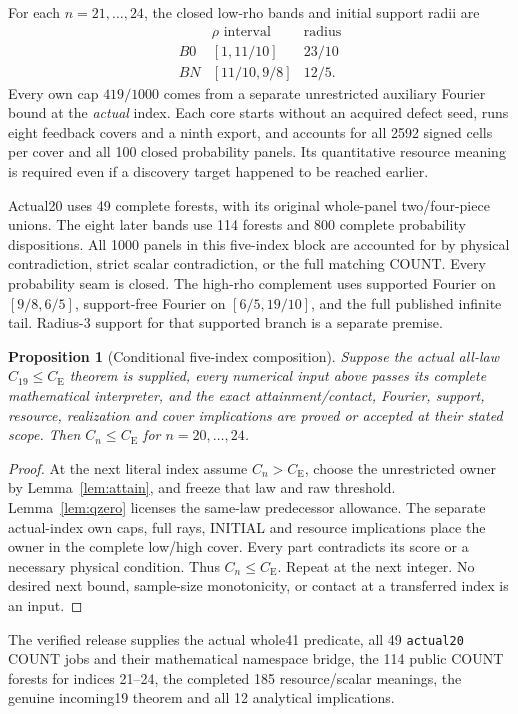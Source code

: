 \documentclass[11pt,a4paper]{article}
\newtheorem{proposition}[theorem]{Proposition}
\newcommand{\CE}{C_{\mathrm E}}
\begin{document}
For each \(n=21,\ldots,24\), the closed low-rho bands and initial support
radii are
\[
 \begin{array}{c|c|c}
 &\rho\text{ interval}&\text{radius}\\ \hline
 B0&[1,11/10]&23/10\\
 BN&[11/10,9/8]&12/5 .
 \end{array}
\]
Every own cap \(419/1000\) comes from a separate unrestricted auxiliary
Fourier bound at the \emph{actual} index. Each core starts without an
acquired defect seed, runs eight feedback covers and a ninth export,
and accounts for all 2592 signed cells per cover and all 100 closed
probability panels. Its quantitative resource meaning is required even
if a discovery target happened to be reached earlier.

Actual20 uses 49 complete forests, with its original whole-panel
two/four-piece unions. The eight later bands use 114 forests and 800
complete probability dispositions. All 1000 panels in this five-index
block are accounted for by physical contradiction, strict scalar
contradiction, or the full matching COUNT. Every probability seam is
closed. The high-rho complement uses supported Fourier on \([9/8,6/5]\),
support-free Fourier on \([6/5,19/10]\), and the full published infinite
tail. Radius-3 support for that supported branch is a separate premise.

\begin{proposition}[Conditional five-index composition]
Suppose the actual all-law \(C_{19}\le\CE\) theorem is supplied, every
numerical input above passes its complete mathematical interpreter, and
the exact attainment/contact, Fourier, support, resource, realization and
cover implications are proved or accepted at their stated scope. Then
\(C_n\le\CE\) for \(n=20,\ldots,24\).
\end{proposition}
\begin{proof}
At the next literal index assume \(C_n>\CE\), choose the unrestricted owner
by Lemma~\ref{lem:attain}, and freeze that law and raw threshold.
Lemma~\ref{lem:qzero} licenses the same-law predecessor allowance.
The separate actual-index own caps, full rays, INITIAL and resource
implications place the owner in the complete low/high cover.
Every part contradicts its score or a necessary physical condition.
Thus \(C_n\le\CE\). Repeat at the next integer. No desired next bound,
sample-size monotonicity, or contact at a transferred index is an input.
\end{proof}

The verified release supplies the actual whole41 predicate, all 49
\texttt{actual20} COUNT jobs and their mathematical namespace bridge, the
114 public COUNT forests for indices 21--24, the completed 185 resource/scalar
meanings, the genuine incoming19 theorem and all 12 analytical implications.
\end{document}
